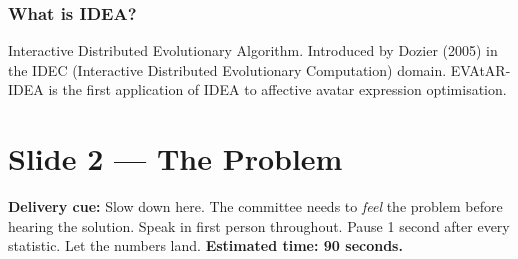 \documentclass[12pt,a4paper]{article}
\begin{document}
\subsubsection{What is IDEA?}
Interactive Distributed Evolutionary Algorithm. Introduced by Dozier (2005) in the IDEC
(Interactive Distributed Evolutionary Computation) domain. EVAtAR-IDEA is the first application
of IDEA to affective avatar expression optimisation.

\newpage
\section{Slide 2 --- The Problem}

\begin{cuebox}
\textbf{Delivery cue:} Slow down here. The committee needs to \textit{feel} the problem before
hearing the solution. Speak in first person throughout. Pause 1 second after every statistic.
Let the numbers land. \textbf{Estimated time: 90 seconds.}
\end{cuebox}
\end{document}
